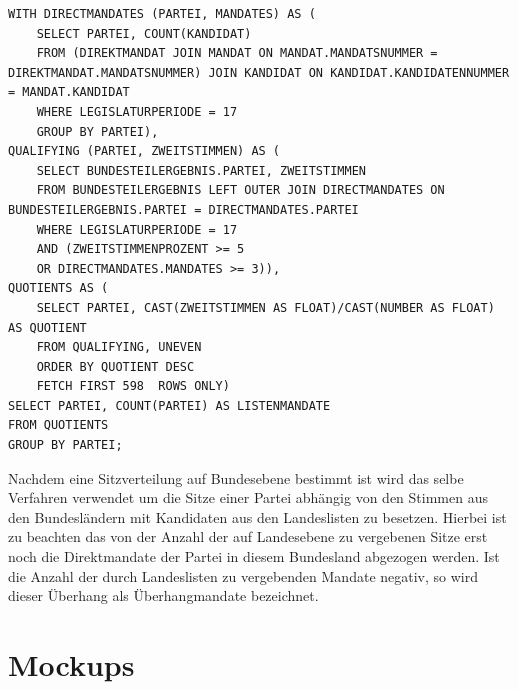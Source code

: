 \documentclass[a4paper]{article}
\begin{document}
\lstset{
language=SQL,
basicstyle=\footnotesize,       %
numbers=left,                   %
numberstyle=\footnotesize,      %
stepnumber=2,                   %
numbersep=5pt,                  %
showspaces=false,               %
showstringspaces=false,         %
frame=single,	                %
tabsize=2,	                %
captionpos=b,                   %
breaklines=true                %
}
\begin{lstlisting}[caption=Bestimmung der Listenmandate für die 17. Legislaturperiode]
WITH DIRECTMANDATES (PARTEI, MANDATES) AS (
	SELECT PARTEI, COUNT(KANDIDAT)
	FROM (DIREKTMANDAT JOIN MANDAT ON MANDAT.MANDATSNUMMER = DIREKTMANDAT.MANDATSNUMMER) JOIN KANDIDAT ON KANDIDAT.KANDIDATENNUMMER = MANDAT.KANDIDAT
	WHERE LEGISLATURPERIODE = 17
	GROUP BY PARTEI),
QUALIFYING (PARTEI, ZWEITSTIMMEN) AS (
	SELECT BUNDESTEILERGEBNIS.PARTEI, ZWEITSTIMMEN    
	FROM BUNDESTEILERGEBNIS LEFT OUTER JOIN DIRECTMANDATES ON BUNDESTEILERGEBNIS.PARTEI = DIRECTMANDATES.PARTEI
	WHERE LEGISLATURPERIODE = 17
	AND (ZWEITSTIMMENPROZENT >= 5
	OR DIRECTMANDATES.MANDATES >= 3)),
QUOTIENTS AS (
	SELECT PARTEI, CAST(ZWEITSTIMMEN AS FLOAT)/CAST(NUMBER AS FLOAT) AS QUOTIENT
	FROM QUALIFYING, UNEVEN
	ORDER BY QUOTIENT DESC
	FETCH FIRST 598  ROWS ONLY)
SELECT PARTEI, COUNT(PARTEI) AS LISTENMANDATE
FROM QUOTIENTS
GROUP BY PARTEI;
\end{lstlisting}

Nachdem eine Sitzverteilung auf Bundesebene bestimmt ist wird das selbe Verfahren verwendet um die Sitze einer Partei abhängig von den Stimmen aus den Bundesländern mit Kandidaten aus den Landeslisten zu besetzen. Hierbei ist zu beachten das von der Anzahl der auf Landesebene zu vergebenen Sitze erst noch die Direktmandate der Partei in diesem Bundesland abgezogen werden. Ist die Anzahl der durch Landeslisten zu vergebenden Mandate negativ, so wird dieser Überhang als Überhangmandate bezeichnet.

\addappheadtotoc
\appendix
\newpage

\section{Mockups}
\label{mockups}
\end{document}
